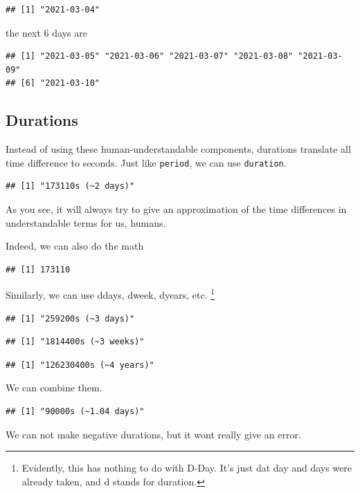 \documentclass[]{tufte-book}
\begin{document}
\begin{verbatim}
## [1] "2021-03-04"
\end{verbatim}

the next 6 days are

\begin{verbatim}
## [1] "2021-03-05" "2021-03-06" "2021-03-07" "2021-03-08" "2021-03-09"
## [6] "2021-03-10"
\end{verbatim}

\hypertarget{durations}{%
\subsection{Durations}\label{durations}}

Instead of using these human-understandable components, durations translate all time difference to seconds. Just like \texttt{period}, we can use \texttt{duration}.

\begin{verbatim}
## [1] "173110s (~2 days)"
\end{verbatim}

As you see, it will always try to give an approximation of the time differences in understandable terms for us, humans.

Indeed, we can also do the math

\begin{verbatim}
## [1] 173110
\end{verbatim}

Similarly, we can use ddays, dweek, dyears, etc. \footnote{Evidently, this has nothing to do with D-Day. It's just dat day and days were already taken, and d stands for duration.}

\begin{verbatim}
## [1] "259200s (~3 days)"
\end{verbatim}

\begin{verbatim}
## [1] "1814400s (~3 weeks)"
\end{verbatim}

\begin{verbatim}
## [1] "126230400s (~4 years)"
\end{verbatim}

We can combine them.

\begin{verbatim}
## [1] "90000s (~1.04 days)"
\end{verbatim}

We can not make negative durations, but it wont really give an error.
\end{document}
